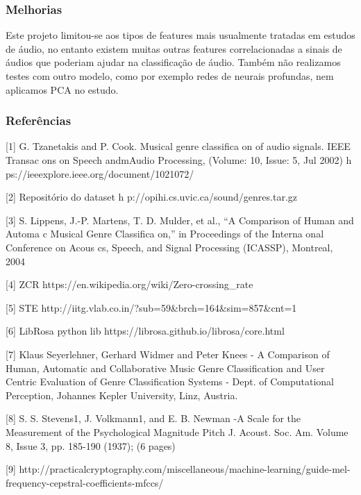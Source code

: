 \documentclass[11pt]{article}
\begin{document}
\subsubsection{Melhorias}\label{melhorias}

Este projeto limitou-se aos tipos de features mais usualmente tratadas
em estudos de áudio, no entanto existem muitas outras features
correlacionadas a sinais de áudios que poderiam ajudar na classificação
de áudio. Também não realizamos testes com outro modelo, como por
exemplo redes de neurais profundas, nem aplicamos PCA no estudo.

    \subsubsection{Referências}\label{referuxeancias}

{[}1{]} G. Tzanetakis and P. Cook. Musical genre classifica on of audio
signals. IEEE Transac ons on Speech andmAudio Processing, (Volume: 10,
Issue: 5, Jul 2002) h ps://ieeexplore.ieee.org/document/1021072/

{[}2{]} Repositório do dataset h
p://opihi.cs.uvic.ca/sound/genres.tar.gz

{[}3{]} S. Lippens, J.-P. Martens, T. D. Mulder, et al., ``A Comparison
of Human and Automa c Musical Genre Classifica on,'' in Proceedings of
the Interna onal Conference on Acous cs, Speech, and Signal Processing
(ICASSP), Montreal, 2004

{[}4{]} ZCR https://en.wikipedia.org/wiki/Zero-crossing\_rate

{[}5{]} STE http://iitg.vlab.co.in/?sub=59\&brch=164\&sim=857\&cnt=1

{[}6{]} LibRosa python lib https://librosa.github.io/librosa/core.html

{[}7{]} Klaus Seyerlehner, Gerhard Widmer and Peter Knees - A Comparison
of Human, Automatic and Collaborative Music Genre Classification and
User Centric Evaluation of Genre Classification Systems - Dept. of
Computational Perception, Johannes Kepler University, Linz, Austria.

{[}8{]} S. S. Stevens1, J. Volkmann1, and E. B. Newman -A Scale for the
Measurement of the Psychological Magnitude Pitch J. Acoust. Soc. Am.
Volume 8, Issue 3, pp. 185-190 (1937); (6 pages)

{[}9{]}
http://practicalcryptography.com/miscellaneous/machine-learning/guide-mel-frequency-cepstral-coefficients-mfccs/


    
    
    
    
\end{document}
